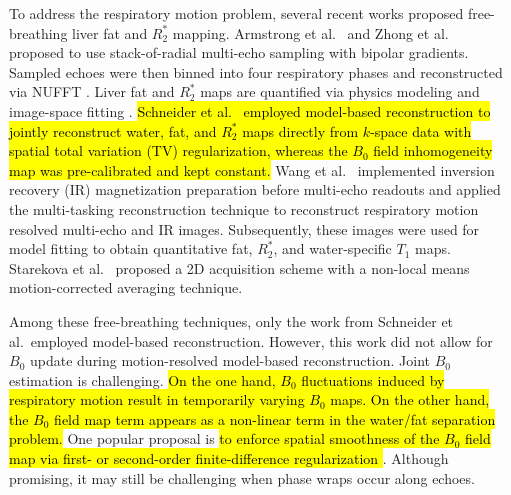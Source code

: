 \documentclass[journal,twoside,web]{ieeecolor}
\begin{document}
To address the respiratory motion problem, 
several recent works proposed free-breathing liver fat and $R_2^*$ mapping. 
Armstrong et al.~\cite{armstrong_2018_fat} and 
Zhong et al.~\cite{zhong_2020_r2sclinic,zhong_2020_resr2s} 
proposed to use stack-of-radial multi-echo sampling with bipolar gradients. 
Sampled echoes were then binned into four respiratory phases 
and reconstructed via NUFFT \cite{fessler_2003_nufft}. 
Liver fat and $R_2^*$ maps are quantified 
via physics modeling \cite{yu_2007_t2sideal,yu_2008_mft2sideal,chebrolu_2010_indiwf} 
and image-space fitting \cite{reeder_2005_ideal,hernando_2010_gc,zhong_2014_wfadafit}. 
\hl{Schneider et al.~\mbox{\cite{schneider_2020_mobawfr2s}} 
employed model-based reconstruction 
\mbox{\cite{block_2009_mobat2,fessler_2010_moba,doneva_2010_mobawf}} 
to jointly reconstruct water, fat, and $R_2^*$ maps directly from $k$-space data 
with spatial total variation (TV) regularization, 
whereas the $B_0$ field inhomogeneity map was pre-calibrated \mbox{\cite{hernando_2010_gc}} 
and kept constant. } 
Wang et al.~\cite{wang_2022_mt-me} implemented 
inversion recovery (IR) magnetization preparation before multi-echo readouts 
and applied the multi-tasking reconstruction technique \cite{christodoulou_2018_mt} 
to reconstruct respiratory motion resolved multi-echo and IR images. 
Subsequently, these images were used for model fitting \cite{hernando_2010_gc} 
to obtain quantitative fat, $R_2^*$, and water-specific $T_1$ maps. 
Starekova et al.~\cite{starekova_2022_fb-fat} proposed a 2D acquisition scheme 
with a non-local means \cite{buades_2005_nlm} motion-corrected averaging technique. 

Among these free-breathing techniques, only the work from Schneider et al.~employed 
model-based reconstruction. However, this work did not allow for $B_0$ update during 
motion-resolved model-based reconstruction. Joint $B_0$ estimation is challenging. 
\hl{On the one hand, $B_0$ fluctuations induced by respiratory motion 
	result in temporarily varying $B_0$ maps. 
	On the other hand, the $B_0$ field map term appears as a non-linear term 
	in the water/fat separation problem.} 
One popular proposal is \hl{to enforce spatial smoothness of the $B_0$ field map 
	via first- or second-order finite-difference regularization 
	\mbox{\cite{sutton_2004_dynamicfield,olafsson_2008_joint,funai_2008_secondorder}}}. 
Although promising, it may still be challenging when phase wraps occur along echoes. 
\end{document}
